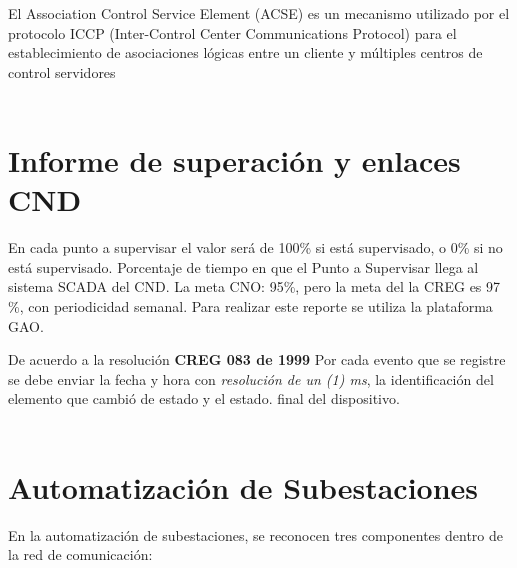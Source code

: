 \documentclass[a5paper]{book}%
\begin{document}
El Association Control Service Element (ACSE) es un mecanismo utilizado por el protocolo ICCP (Inter-Control Center Communications Protocol) para el establecimiento de asociaciones lógicas entre un cliente y múltiples centros de control servidores\\\\


  \section{Informe de superación y enlaces CND}

  En cada punto a supervisar el valor será de 100\% si está supervisado, o 0\% si no está supervisado. Porcentaje de tiempo en que el Punto a Supervisar llega al sistema SCADA del CND. La meta CNO: 95\%, pero la meta del la CREG es 97 \%,  con periodicidad semanal. Para realizar este reporte se utiliza la plataforma GAO.


  
  De acuerdo a la resolución \textbf{CREG 083 de 1999} Por cada evento que se registre se debe enviar la fecha y hora con \textit{resolución de un (1) ms}, la identificación del elemento que cambió de estado y el estado. final del dispositivo.\\\\


  \section{Automatización de Subestaciones}

En la automatización de subestaciones,  se reconocen  tres componentes dentro de la red de comunicación:
\end{document}
